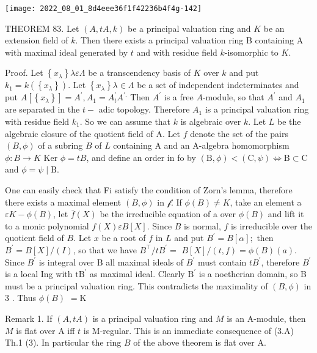 \texttt{[image: 2022\_08\_01\_8d4eee36f1f42236b4f4g-142]}

THEOREM 83. Let $(A, t A, k)$ be a principal valuation ring and $K$ be an extension field of $k$. Then there exists a principal valuation ring B containing A with maximal ideal generated by $t$ and with residue field $k$-isomorphic to $K$.

Proof. Let $\left\{x_{\lambda}\right\} \lambda \varepsilon \Lambda$ be a transcendency basis of $K$ over $k$ and put $k_{1}=k\left(\left\{x_{\lambda}\right\}\right)$. Let $\left\{x_{\lambda}\right\} \lambda \in \Lambda$ be a set of independent indeterminates and put $A\left[\left\{x_{\lambda}\right\}\right]=A^{\prime}, A_{1}=A_{t}^{\prime} A^{\prime .}$ Then $A^{\prime}$ is a free $A$-module, so that $A^{\prime}$ and $A_{1}$ are separated in the $t-$ adic topology. Therefore $A_{1}$ is a principal valuation ring with residue field $k_{1}$. So we can assume that $k$ is algebraic over $k$. Let $L$ be the algebraic closure of the quotient field of A. Let $f$ denote the set of the pairs $(B, \phi)$ of a subring $B$ of $L$ containing A and an A-algebra homomorphism $\phi: B \rightarrow K$ Ker $\phi=t B$, and define an order in fo by $(\mathrm{B}, \phi)<(\mathrm{C}, \psi) \Longleftrightarrow \mathrm{B} \subset \mathrm{C}$ and $\phi=\psi \mid \mathrm{B} .$

One can easily check that Fi satisfy the condition of Zorn's lemma, therefore there exists a maximal element $(B, \phi)$ in $\mathcal{f}$. If $\phi(B) \neq K$, take an element a $\varepsilon K-\phi(B)$, let $\bar{f}(X)$ be the irreducible equation of a over $\phi(B)$ and lift it to a monic polynomial $f(X) \varepsilon B[X]$. Since $B$ is normal, $f$ is irreducible over the quotient field of $B$. Let $x$ be a root of $f$ in $L$ and put $B^{\prime}=B[\alpha] ;$ then $B^{\prime}=B[X] /(I)$, so that we have $B^{\top} / t B^{\prime}=$ $B[X] /(t, f)=\phi(B)(a)$. Since $B^{\prime}$ is integral over B all maximal ideals of $B^{\prime}$ must contain $t B^{\prime}$, therefore $B^{\prime}$ is a local Ing with $\mathrm{tB}^{\prime}$ as maximal ideal. Clearly $\mathrm{B}^{\prime}$ is a noetherian domain, so B must be a principal valuation ring. This contradicts the maximality of $(B, \phi)$ in 3 . Thus $\phi(B)$ $=\mathrm{K}$

Remark 1. If $(A, t A)$ is a principal valuation ring and $M$ is an A-module, then $M$ is flat over A iff $t$ is M-regular. This is an immediate consequence of (3.A) Th.1 (3). In particular the ring $B$ of the above theorem is flat over A.

